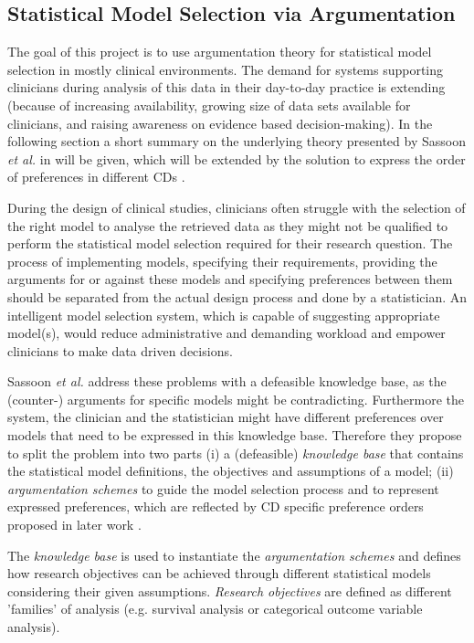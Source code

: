 \subsection{Statistical Model Selection via Argumentation}

\label{sub:statistical_model_selection}

The goal of this project is to use argumentation theory for statistical model selection in mostly clinical environments. The demand for systems supporting clinicians during analysis of this data in their day-to-day practice is extending (because of increasing availability, growing size of data sets available for clinicians, and raising awareness on evidence based decision-making). In the following section a short summary on the underlying theory presented by Sassoon \textit{et al.} in \cite{sassoon2014} will be given, which will be extended by the solution to express the order of preferences in different \glspl{CD} \cite{sassoon2016,sassoon2016CD}.

During the design of clinical studies, clinicians often struggle with the selection of the right model to analyse the retrieved data as they might not be qualified to perform the statistical model selection required for their research question. The process of implementing models, specifying their requirements, providing the arguments for or against these models and specifying preferences between them should be separated from the actual design process and  done by a statistician. An intelligent model selection system, which is capable of suggesting appropriate model(s), would reduce administrative and demanding workload and empower clinicians to make data driven decisions.

Sassoon \textit{et al.} \cite{sassoon2014} address these problems with a defeasible knowledge base, as the (counter-) arguments for specific models might be contradicting. Furthermore the system, the clinician and the statistician might have different preferences over models that need to be expressed in this knowledge base. Therefore they propose to split the problem into two parts (i) a (defeasible) \textit{knowledge base} that contains the statistical model definitions, the objectives and assumptions of a model; (ii) \textit{argumentation schemes} to guide the model selection process and to represent expressed preferences, which are reflected by \gls{CD} specific preference orders proposed in later work \cite{sassoon2016,sassoon2016CD} .

The \textit{knowledge base} is used to instantiate the \textit{argumentation schemes} and defines how research objectives can be achieved through different statistical models considering their given assumptions. \textit{Research objectives} are defined as different 'families' of analysis (e.g. survival analysis or categorical outcome variable analysis).


